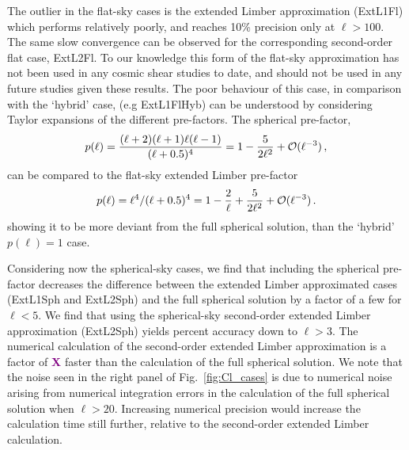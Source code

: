 \documentclass[fleqn,usenatbib]{mnras} %
\newcommand{\ch}[1]{\textcolor{purple}{\bf #1}}
\begin{document}
The outlier in the flat-sky cases is the extended Limber approximation (ExtL1Fl) which performs relatively poorly, and
reaches 10\% precision only at $\ell > 100$. The same slow convergence can be
observed for the corresponding second-order flat case, ExtL2Fl. To our knowledge this form of the flat-sky approximation has not been used in any cosmic shear studies to date, and should not be used in any future studies given these results.  The poor behaviour of this case, in comparison with the `hybrid' case, (e.g ExtL1FlHyb) can be understood by considering Taylor expansions of the different pre-factors.  The spherical pre-factor,
\begin{equation}
p(\ell) = \frac{(\ell+2)(\ell+1)\ell(\ell-1)}{(\ell + 0.5)^4} = 1-{5\over 2\ell^2} +{\cal O}(\ell^{-3}) \, ,
\end{equation}
can be compared to the flat-sky extended Limber pre-factor
\begin{equation}
p(\ell) = \ell^4 / (\ell + 0.5)^4 = 1-{2\over \ell}+{5\over 2\ell^2} +{\cal O}(\ell^{-3}) \, . 
\end{equation} 
showing it to be more deviant from the full spherical solution, than the `hybrid' $p(\ell) = 1$ case. 

Considering now the spherical-sky cases, we find that including the spherical pre-factor decreases the difference between the extended Limber approximated cases (ExtL1Sph and ExtL2Sph) and the full spherical solution by a factor of a few for $\ell < 5$.   We find that using the spherical-sky second-order extended Limber approximation (ExtL2Sph) yields percent accuracy down to $\ell > 3$.  The numerical calculation of the second-order extended Limber approximation is a factor of \ch{X} faster than the calculation of the full spherical solution.   We note that the noise seen in the right panel of Fig.~\ref{fig:Cl_cases} is due to numerical noise arising from numerical integration errors in the calculation of 
the full spherical solution when $\ell > 20$.  Increasing numerical precision would increase the calculation time still further, relative to the  second-order extended Limber calculation.
\end{document}
